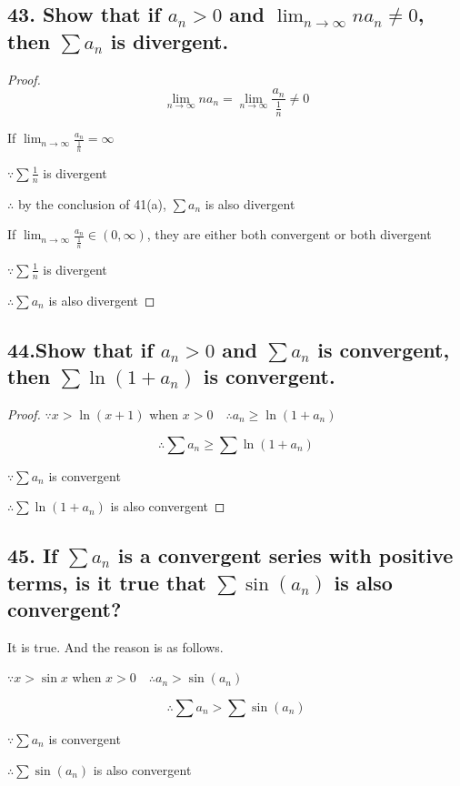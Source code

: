 \documentclass{article}
\begin{document}
    \subsection*{43. Show that if $a_n > 0$ and $\lim_{n\to\infty} na_n \not = 0$, then $\sum a_n$ is divergent.} 

    \begin{proof}
        $$\lim_{n\to\infty} na_n = \lim_{n\to\infty} \frac{a_n}{\frac 1 n} \not = 0$$

        If $\lim_{n\to\infty}\frac{a_n}{\frac 1 n} = \infty$
        
        $\because \sum \frac 1 n$ is divergent

        $\therefore$ by the conclusion of 41(a), $\sum a_n$ is also divergent

        If $\lim_{n\to\infty} \frac{a_n}{\frac 1 n} \in (0, \infty)$, they are either both convergent or both divergent

        $\because \sum \frac 1 n$ is divergent

        $\therefore \sum a_n$ is also divergent

    \end{proof}

    \subsection*{44.Show that if $a_n > 0$ and $\sum a_n$ is convergent, then $\sum \ln(1 + a_n )$ is convergent.}

    \begin{proof}
        $\because x > \ln (x+1)$ when $x > 0 \quad \therefore a_n \geq \ln (1+a_n)$

        $$\therefore \sum a_n \geq \sum \ln(1+a_n)$$

        $\because \sum a_n$ is convergent

        $\therefore \sum \ln (1+a_n)$ is also convergent
    \end{proof}

    \subsection*{45. If $\sum a_n$ is a convergent series with positive terms, is it true that $\sum \sin (a_n)$ is also convergent?}

    It is true. And the reason is as follows.

    $\because x > \sin x$ when $x > 0 \quad \therefore a_n > \sin (a_n)$

    $$\therefore \sum a_n > \sum \sin (a_n)$$

    $\because \sum a_n$ is convergent

    $\therefore \sum \sin (a_n)$ is also convergent
    
    
\end{document}

